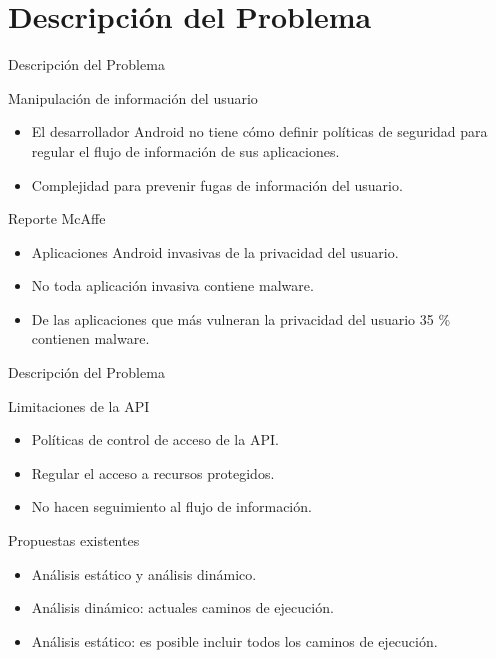  \section{Descripción del Problema}

\begin{frame}{Descripción del Problema}
	\begin{block}{Manipulación de información del usuario}
	\begin{itemize}
	\item El desarrollador Android no tiene cómo definir políticas de seguridad para
	regular el flujo de información de sus aplicaciones.\pause
	\item Complejidad para prevenir fugas de información del usuario.
	\end{itemize}
	\end{block}
	\pause
	\begin{block}{Reporte McAffe}
	\begin{itemize}
	\item Aplicaciones Android invasivas de la privacidad del usuario.\pause
	\item No toda aplicación invasiva contiene malware.\pause
	\item De las aplicaciones que más vulneran la privacidad del usuario 35 \%
	contienen malware.
	\end{itemize}
	\end{block}
\end{frame}

\begin{frame}{Descripción del Problema}
\begin{block}{Limitaciones de la API}
\begin{itemize}
  \item Políticas de control de acceso de la API.\pause
  \item Regular el acceso a recursos protegidos.\pause
  \item No hacen seguimiento al flujo de información.
\end{itemize}
\end{block}
\pause
\begin{block}{Propuestas existentes}
\begin{itemize}
  \item Análisis estático y análisis dinámico.\pause
  \item Análisis dinámico: actuales caminos de ejecución.\pause
  \item Análisis estático: es posible incluir todos los caminos de ejecución.
\end{itemize}
\end{block}
\end{frame}

